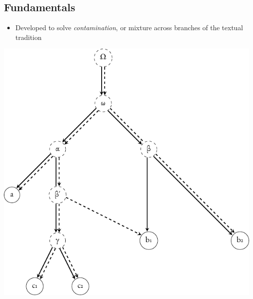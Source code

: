 \documentclass[10pt]{beamer}
\begin{document}
	\subsection{Fundamentals}
	\begin{frame}
		\begin{itemize}
			\item Developed to solve \emph{contamination}, or mixture across branches of the textual tradition
		\end{itemize}
		\begin{center}
			\includegraphics[scale=0.6667]{../img/stemma-rooted-contamination.pdf}
		\end{center}
	\end{frame}
\end{document}
